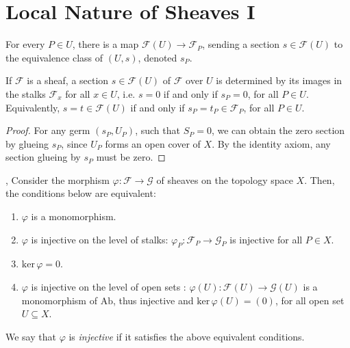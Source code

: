 \documentclass[11pt]{article}
\begin{document}
\section{Local Nature of Sheaves I}

\begin{lemma}
    \label{lemma: taking stalks}
    For every $P \in U$, there is a map 
    $\mathscr{F}(U) \to \mathscr{F}_{P}$, 
    sending a section $s \in \mathscr{F}(U)$ to 
    the equivalence class of $(U,s)$, denoted $s_{P}$. 

    If $\mathscr{F}$ is a sheaf, 
    a section $s \in \mathscr{F}(U)$ of $\mathscr{F}$ over $U$ 
    is determined by its images in the stalks $\mathscr{F}_{x}$ 
    for all $x \in U$, i.e. $s=0$ if and only if 
    $s_{P}=0$, for all $P \in U$. 
    Equivalently, $s=t \in \mathscr{F}(U)$ 
    if and only if $s_{P}=t_{P} \in \mathscr{F}_{P}$, 
    for all $P \in U$.
\end{lemma}

\begin{proof}
    For any germ $ (s_{P},U_{P}) $, such that $ S_{P}=0 $, 
    we can obtain the zero section by glueing $ s_{P} $, 
    since $ U_{P} $ forms an open cover of $ X $. 
    By the identity axiom, any section glueing by $ s_{P} $ 
    must be zero. 
\end{proof}

\begin{proposition}
    \label{prop: injective morphisms}
    \cite[2.4 N]{vakilTheRisingSea}, \cite[Ex 1.3 (a)]{hartsAG} 
    Consider the morphism $\varphi:\mathscr{F} \to \mathscr{G}$ 
    of sheaves on the topology space $X$. 
    Then, the conditions below are equivalent: 
    \begin{enumerate}[label = (\arabic*)]
    \item $\varphi$ is a monomorphism. 
    \item $\varphi$ is injective on the level 
        of stalks: $\varphi_{P}:\mathscr{F}_{P}\to \mathscr{G}_{P}$ 
        is injective for all $P \in X$. 
    \item $\mathrm{ker}\,\varphi=0$.  
    \item $\varphi$ is injective on the level of open 
    sets : $\varphi(U): \mathscr{F}(U) \to \mathscr{G}(U)$ 
    is a monomorphism of $\mathrm{Ab}$, 
    thus injective and $\mathrm{ker}\,\varphi(U) = (0)$, 
    for all open set $U \subseteq X$. 
    \end{enumerate}

    We say that $\varphi$ is \emph{injective} 
    if it satisfies the above equivalent conditions.
\end{proposition}
\end{document}
